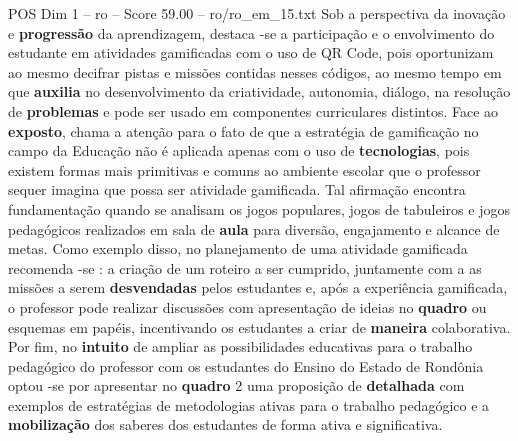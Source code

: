 \begin{textsample}{POS Dim 1 – ro – Score 59.00 – ro/ro\_em\_15.txt}
Sob a perspectiva da inovação e \textbf{progressão} da aprendizagem, destaca -se a participação e o envolvimento do estudante em atividades gamificadas com o uso de QR Code, pois oportunizam ao mesmo decifrar pistas e missões contidas nesses códigos, ao mesmo tempo em que \textbf{auxilia} no desenvolvimento da criatividade, autonomia, diálogo, na resolução de \textbf{problemas} e pode ser usado em componentes curriculares distintos.
Face ao \textbf{exposto}, chama a atenção para o fato de que a estratégia de gamificação no campo da Educação não é aplicada apenas com o uso de \textbf{tecnologias}, pois existem formas mais primitivas e comuns ao ambiente escolar que o professor sequer imagina que possa ser atividade gamificada.
Tal afirmação encontra fundamentação quando se analisam os jogos populares, jogos de tabuleiros e jogos pedagógicos realizados em sala de \textbf{aula} para diversão, engajamento e alcance de metas.
Como exemplo disso, no planejamento de uma atividade gamificada recomenda -se : a criação de um roteiro a ser cumprido, juntamente com a as missões a serem \textbf{desvendadas} pelos estudantes e, após a experiência gamificada, o professor pode realizar discussões com apresentação de ideias no \textbf{quadro} ou esquemas em papéis, incentivando os estudantes a criar de \textbf{maneira} colaborativa.
Por fim, no \textbf{intuito} de ampliar as possibilidades educativas para o trabalho pedagógico do professor com os estudantes do Ensino do Estado de Rondônia optou -se por apresentar no \textbf{quadro} 2 uma proposição de \textbf{detalhada} com exemplos de estratégias de metodologias ativas para o trabalho pedagógico e a \textbf{mobilização} dos saberes dos estudantes de forma ativa e significativa.

\end{textsample}
